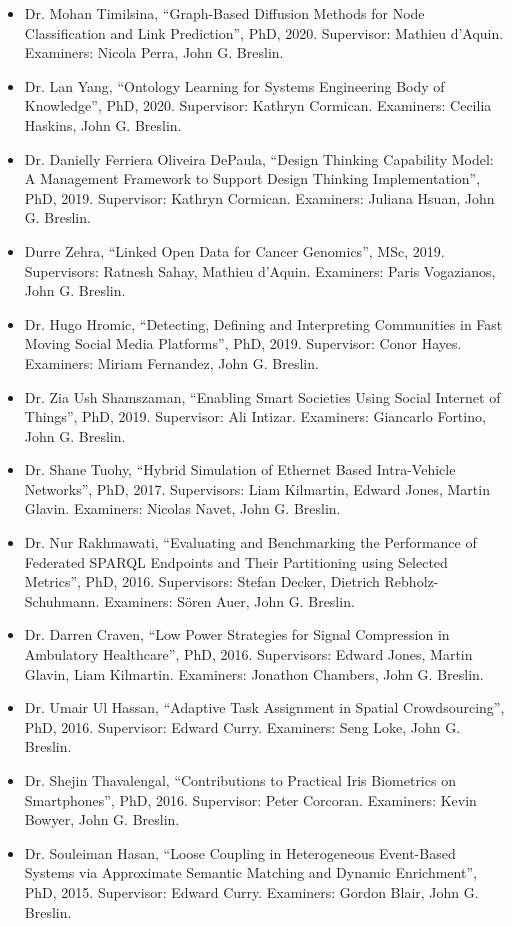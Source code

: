 \documentclass[10pt,a4paper]{res} %
\begin{document}
\begin{resume}
\begin{itemize}
\item Dr. Mohan Timilsina, ``Graph-Based Diffusion Methods for Node Classification and Link Prediction'', PhD, 2020. Supervisor: Mathieu d'Aquin. Examiners: Nicola Perra, John G. Breslin.
\item Dr. Lan Yang, ``Ontology Learning for Systems Engineering Body of Knowledge'', PhD, 2020. Supervisor: Kathryn Cormican. Examiners: Cecilia Haskins, John G. Breslin.
\item Dr. Danielly Ferriera Oliveira DePaula, ``Design Thinking Capability Model: A Management Framework to Support Design Thinking Implementation'', PhD, 2019. Supervisor: Kathryn Cormican. Examiners: Juliana Hsuan, John G. Breslin.
\item Durre Zehra, ``Linked Open Data for Cancer Genomics'', MSc, 2019. Supervisors: Ratnesh Sahay, Mathieu d'Aquin. Examiners: Paris Vogazianos, John G. Breslin.
\item Dr. Hugo Hromic, ``Detecting, Defining and Interpreting Communities in Fast Moving Social Media Platforms'', PhD, 2019. Supervisor: Conor Hayes. Examiners: Miriam Fernandez, John G. Breslin.
\item Dr. Zia Ush Shamszaman, ``Enabling Smart Societies Using Social Internet of Things'', PhD, 2019. Supervisor: Ali Intizar. Examiners: Giancarlo Fortino, John G. Breslin.
\item Dr. Shane Tuohy, ``Hybrid Simulation of Ethernet Based Intra-Vehicle Networks'', PhD, 2017. Supervisors: Liam Kilmartin, Edward Jones, Martin Glavin. Examiners: Nicolas Navet, John G. Breslin.
\item Dr. Nur Rakhmawati, ``Evaluating and Benchmarking the Performance of Federated SPARQL Endpoints and Their Partitioning using Selected Metrics'', PhD, 2016. Supervisors: Stefan Decker, Dietrich Rebholz-Schuhmann. Examiners: S\"{o}ren Auer, John G. Breslin.
\item Dr. Darren Craven, ``Low Power Strategies for Signal Compression in Ambulatory Healthcare'', PhD, 2016. Supervisors: Edward Jones, Martin Glavin, Liam Kilmartin. Examiners: Jonathon Chambers, John G. Breslin.
\item Dr. Umair Ul Hassan, ``Adaptive Task Assignment in Spatial Crowdsourcing'', PhD, 2016. Supervisor: Edward Curry. Examiners: Seng Loke, John G. Breslin.
\item Dr. Shejin Thavalengal, ``Contributions to Practical Iris Biometrics on Smartphones'', PhD, 2016. Supervisor: Peter Corcoran. Examiners: Kevin Bowyer, John G. Breslin.
\item Dr. Souleiman Hasan, ``Loose Coupling in Heterogeneous Event-Based Systems via Approximate Semantic Matching and Dynamic Enrichment'', PhD, 2015. Supervisor: Edward Curry. Examiners: Gordon Blair, John G. Breslin.

\end{itemize}
\end{resume}
\end{document}
